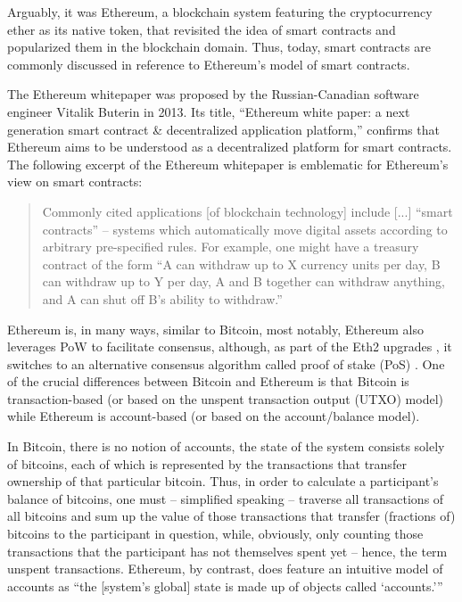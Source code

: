 Arguably, it was Ethereum, a blockchain system featuring the cryptocurrency ether as its native token, that revisited the idea of smart contracts and popularized them in the blockchain domain.
Thus, today, smart contracts are commonly discussed in reference to Ethereum's model of smart contracts.

The Ethereum whitepaper was proposed by the Russian-Canadian software engineer Vitalik Buterin in 2013. \autocite{buterin2013a, buterin2013b}
Its title, ``Ethereum white paper: a next generation smart contract \& decentralized application platform,'' confirms that Ethereum aims to be understood as a decentralized platform for smart contracts.
The following excerpt of the Ethereum whitepaper is emblematic for Ethereum's view on smart contracts: \autocite[1]{buterin2013a}

\begin{quote}
  Commonly cited applications [of blockchain technology] include [...] ``smart contracts'' -- systems which automatically move digital assets according to arbitrary pre-specified rules.
  For example, one might have a treasury contract of the form ``A can withdraw up to X currency units per day, B can withdraw up to Y per day, A and B together can withdraw anything, and A can shut off B's ability to withdraw.''
\end{quote}

Ethereum is, in many ways, similar to Bitcoin, most notably, Ethereum also leverages PoW to facilitate consensus, although, as part of the Eth2 upgrades \autocite{ethereum2020a}, it switches to an alternative consensus algorithm called proof of stake (PoS) \autocite{ethereum2020b}.
One of the crucial differences between Bitcoin and Ethereum is that Bitcoin is transaction-based (or based on the unspent transaction output (UTXO) model) while Ethereum is account-based (or based on the account/balance model).

In Bitcoin, there is no notion of accounts, the state of the system consists solely of bitcoins, each of which is represented by the transactions that transfer ownership of that particular bitcoin.
Thus, in order to calculate a participant's balance of bitcoins, one must -- simplified speaking -- traverse all transactions of all bitcoins and sum up the value of those transactions that transfer (fractions of) bitcoins to the participant in question, while, obviously, only counting those transactions that the participant has not themselves spent yet -- hence, the term unspent transactions.
Ethereum, by contrast, does feature an intuitive model of accounts as \enquote{the [system's global] state is made up of objects called \enquote{accounts.}} \autocite[13]{buterin2013a}

